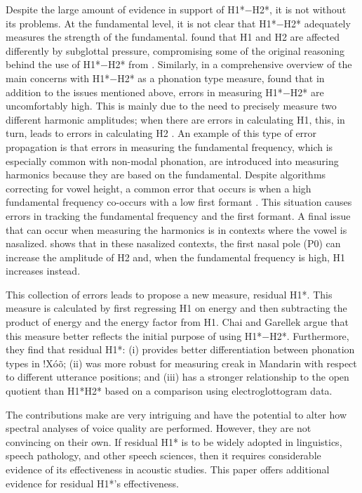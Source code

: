 Despite the large amount of evidence in support of H1*$-$H2*, it is not without its problems. At the fundamental level, it is not clear that H1*$-$H2* adequately measures the strength of the fundamental. \citet{sundbergObjectiveCharacterizationPhonation2022} found that H1 and H2 are affected differently by subglottal pressure, compromising some of the original reasoning behind the use of H1*$-$H2* from \citet{fischer-jorgensenPhoneticAnalysisBreathy1968}. Similarly, in a comprehensive overview of the main concerns with H1*$-$H2* as a phonation type measure, \citet{chaiH1H2AcousticMeasure2022} found that in addition to the issues mentioned above, errors in measuring H1*$-$H2* are uncomfortably high. This is mainly due to the need to precisely measure two different harmonic amplitudes; when there are errors in calculating H1, this, in turn, leads to errors in calculating H2 \citep{arrasIntroductionErrorPropagation1998}. An example of this type of error propagation is that errors in measuring the fundamental frequency, which is especially common with non-modal phonation, are introduced into measuring harmonics because they are based on the fundamental. Despite algorithms correcting for vowel height, a common error that occurs is when a high fundamental frequency co-occurs with a low first formant \citep{chaiH1H2AcousticMeasure2022}. This situation causes errors in tracking the fundamental frequency and the first formant. A final issue that can occur when measuring the harmonics is in contexts where the vowel is nasalized. \citet{simpsonFirstSecondHarmonics2012} shows that in these nasalized contexts, the first nasal pole (P0) can increase the amplitude of H2 and, when the fundamental frequency is high, H1 increases instead.

This collection of errors leads \citet{chaiH1H2AcousticMeasure2022} to propose a new measure, residual H1*. This measure is calculated by first regressing H1 on energy and then subtracting the product of energy and the energy factor from H1. Chai and Garellek argue that this measure better reflects the initial purpose of using H1*$-$H2*. Furthermore, they find that residual H1*: (i) provides better differentiation between phonation types in !Xóõ; (ii) was more robust for measuring creak in Mandarin with respect to different utterance positions; and (iii) has a stronger relationship to the open quotient than H1*H2* based on a comparison using electroglottogram data.

The contributions \citet{chaiH1H2AcousticMeasure2022} make are very intriguing and have the potential to alter how spectral analyses of voice quality are performed. However, they are not convincing on their own. If residual H1* is to be widely adopted in linguistics, speech pathology, and other speech sciences, then it requires considerable evidence of its effectiveness in acoustic studies. This paper offers additional evidence for residual H1*'s effectiveness. 

